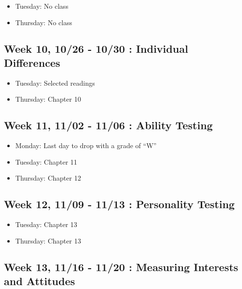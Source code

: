 \documentclass[11pt,]{article}
\providecommand{\tightlist}{%
  \setlength{\itemsep}{0pt}\setlength{\parskip}{0pt}}
\begin{document}
\begin{itemize}
\tightlist
\item
  Tuesday: No class
\item
  Thursday: No class
\end{itemize}

\hypertarget{week-10-1026---1030-individual-differences}{%
\subsection{Week 10, 10/26 - 10/30 : Individual
Differences}\label{week-10-1026---1030-individual-differences}}

\begin{itemize}
\tightlist
\item
  Tuesday: Selected readings
\item
  Thursday: Chapter 10
\end{itemize}

\hypertarget{week-11-1102---1106-ability-testing}{%
\subsection{Week 11, 11/02 - 11/06 : Ability
Testing}\label{week-11-1102---1106-ability-testing}}

\begin{itemize}
\tightlist
\item
  Monday: Last day to drop with a grade of ``W''
\item
  Tuesday: Chapter 11
\item
  Thursday: Chapter 12
\end{itemize}

\hypertarget{week-12-1109---1113-personality-testing}{%
\subsection{Week 12, 11/09 - 11/13 : Personality
Testing}\label{week-12-1109---1113-personality-testing}}

\begin{itemize}
\tightlist
\item
  Tuesday: Chapter 13
\item
  Thursday: Chapter 13
\end{itemize}

\hypertarget{week-13-1116---1120-measuring-interests-and-attitudes}{%
\subsection{Week 13, 11/16 - 11/20 : Measuring Interests and
Attitudes}\label{week-13-1116---1120-measuring-interests-and-attitudes}}
\end{document}
